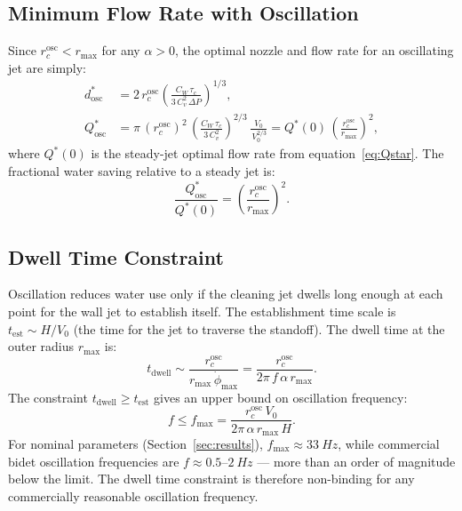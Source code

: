 \documentclass[aps,prfluids,reprint,amsmath,amssymb,floatfix]{revtex4-2}
\begin{document}
\subsection{Minimum Flow Rate with Oscillation}
\label{subsec:osc_flow}

Since $r_c^\mathrm{osc} < r_\mathrm{max}$ for any $\alpha > 0$, the optimal
nozzle and flow rate for an oscillating jet are simply:
\begin{align}
  d_\mathrm{osc}^* &= 2\,r_c^\mathrm{osc}
  \left(\frac{C_W\,\tau_c}{3\,C_v^2\,\Delta P}\right)^{1/3},
  \label{eq:dstarosc}\\
  Q_\mathrm{osc}^* &= \pi\,(r_c^\mathrm{osc})^2\,
  \left(\frac{C_W\,\tau_c}{3\,C_v^2}\right)^{2/3}\,\frac{V_0}{\,V_0^{2/3}}
  = Q^*(0)\,\left(\frac{r_c^\mathrm{osc}}{r_\mathrm{max}}\right)^2,
  \label{eq:Qosc}
\end{align}
where $Q^*(0)$ is the steady-jet optimal flow rate from equation~\eqref{eq:Qstar}.
The fractional water saving relative to a steady jet is:
\begin{equation}
  \frac{Q_\mathrm{osc}^*}{Q^*(0)} = \left(\frac{r_c^\mathrm{osc}}{r_\mathrm{max}}\right)^2.
  \label{eq:Qoscfrac}
\end{equation}

\subsection{Dwell Time Constraint}
\label{subsec:dwell}

Oscillation reduces water use only if the cleaning jet dwells long enough
at each point for the wall jet to establish itself. The establishment time
scale is $t_\mathrm{est} \sim H/V_0$ (the time for the jet to traverse
the standoff). The dwell time at the outer radius $r_\mathrm{max}$ is:
\begin{equation}
  t_\mathrm{dwell} \sim \frac{r_c^\mathrm{osc}}{r_\mathrm{max}\,\dot\phi_\mathrm{max}}
  = \frac{r_c^\mathrm{osc}}{2\pi\,f\,\alpha\,r_\mathrm{max}}.
  \label{eq:tdwell}
\end{equation}
The constraint $t_\mathrm{dwell} \geq t_\mathrm{est}$ gives an upper bound
on oscillation frequency:
\begin{equation}
  f \leq f_\mathrm{max} = \frac{r_c^\mathrm{osc}\,V_0}{2\pi\,\alpha\,r_\mathrm{max}\,H}.
  \label{eq:fmax}
\end{equation}
For nominal parameters (Section~\ref{sec:results}), $f_\mathrm{max} \approx
\SI{33}{Hz}$, while commercial bidet oscillation frequencies are
$f \approx 0.5$--$\SI{2}{Hz}$ --- more than an order of magnitude below
the limit. The dwell time constraint is therefore non-binding for any
commercially reasonable oscillation frequency.
\end{document}
